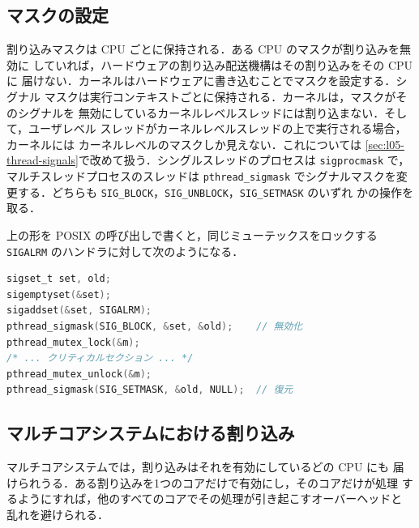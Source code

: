 \documentclass[../main.tex]{subfiles}
\begin{document}
\subsection{マスクの設定}

割り込みマスクは CPU ごとに保持される．ある CPU のマスクが割り込みを無効に
していれば，ハードウェアの割り込み配送機構はその割り込みをその CPU に
届けない．カーネルはハードウェアに書き込むことでマスクを設定する．シグナル
マスクは実行コンテキストごとに保持される．カーネルは，マスクがそのシグナルを
無効にしているカーネルレベルスレッドには割り込まない．そして，ユーザレベル
スレッドがカーネルレベルスレッドの上で実行される場合，カーネルには
カーネルレベルのマスクしか見えない．これについては
\cref{sec:l05-thread-signals}で改めて扱う．シングルスレッドのプロセスは
\texttt{sigprocmask} で，マルチスレッドプロセスのスレッドは
\texttt{pthread\_sigmask} でシグナルマスクを変更する．どちらも
\texttt{SIG\_BLOCK}，\texttt{SIG\_UNBLOCK}，\texttt{SIG\_SETMASK} のいずれ
かの操作を取る．

\begin{example}
  上の形を POSIX の呼び出しで書くと，同じミューテックスをロックする
  \texttt{SIGALRM} のハンドラに対して次のようになる．
  \begin{lstlisting}[language=C, numbers=none]
sigset_t set, old;
sigemptyset(&set);
sigaddset(&set, SIGALRM);
pthread_sigmask(SIG_BLOCK, &set, &old);    // 無効化
pthread_mutex_lock(&m);
/* ... クリティカルセクション ... */
pthread_mutex_unlock(&m);
pthread_sigmask(SIG_SETMASK, &old, NULL);  // 復元
\end{lstlisting}
\end{example}

\subsection{マルチコアシステムにおける割り込み}

マルチコアシステムでは，割り込みはそれを有効にしているどの CPU にも
届けられうる．ある割り込みを1つのコアだけで有効にし，そのコアだけが処理
するようにすれば，他のすべてのコアでその処理が引き起こすオーバーヘッドと
乱れを避けられる．
\end{document}
